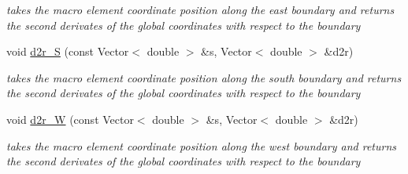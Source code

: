 \begin{DoxyCompactItemize}
\begin{DoxyCompactList}\small\item\em takes the macro element coordinate position along the east boundary and returns the second derivates of the global coordinates with respect to the boundary \end{DoxyCompactList}\item 
void \hyperlink{classoomph_1_1TopologicallyRectangularDomain_ae3bc22aeb952c657f3b3672068243197}{d2r\+\_\+S} (const Vector$<$ double $>$ \&s, Vector$<$ double $>$ \&d2r)
\begin{DoxyCompactList}\small\item\em takes the macro element coordinate position along the south boundary and returns the second derivates of the global coordinates with respect to the boundary \end{DoxyCompactList}\item 
void \hyperlink{classoomph_1_1TopologicallyRectangularDomain_a4522f1751b8105bb7da4e1a14a75c05a}{d2r\+\_\+W} (const Vector$<$ double $>$ \&s, Vector$<$ double $>$ \&d2r)
\begin{DoxyCompactList}\small\item\em takes the macro element coordinate position along the west boundary and returns the second derivates of the global coordinates with respect to the boundary \end{DoxyCompactList}\end{DoxyCompactItemize}
